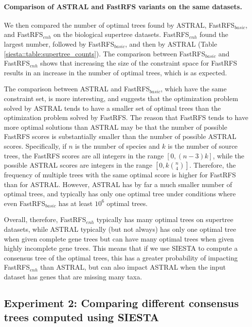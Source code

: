 \paragraph{Comparison of ASTRAL and FastRFS variants on the same datasets. }


We then compared the number of optimal trees found by  ASTRAL, FastRFS$_{basic}$, and FastRFS$_{enh}$ on the biological supertree datasets.
FastRFS$_{enh}$ found the largest number,  followed by FastRFS$_{basic}$,
and then by ASTRAL (Table \ref{siesta::table:supertree_counts}). 
The comparison between FastRFS$_{basic}$ and FastRFS$_{enh}$ shows that increasing the size of the constraint space for FastRFS results in an increase in the number of optimal trees, which is as expected. 



The comparison between ASTRAL and FastRFS$_{basic}$, which have the same constraint set, is more interesting, and suggests that the optimization problem solved by ASTRAL tends to have a smaller set of optimal trees than the optimization problem solved by FastRFS.
The reason that FastRFS tends to have more optimal solutions than ASTRAL may be that the number of possible FastRFS scores is substantially smaller than the number of possible ASTRAL scores. 
Specifically, if $n$ is the number of species and $k$ is the number of source trees, the FastRFS scores are all integers in the range $[0,(n-3)k]$, while the possible ASTRAL scores are  integers in the range $[0,k{n \choose 4}]$.
Therefore, the frequency of  multiple trees with the same optimal score is higher for FastRFS than for ASTRAL.
However, ASTRAL has by far a much smaller number of optimal trees, and typically has only one optimal tree under conditions where even FastRFS$_{basic}$ has at least $10^6$ optimal trees.


Overall, therefore, FastRFS$_{enh}$ typically has many optimal trees on supertree datasets, while ASTRAL typically (but not always) has only one  optimal tree when given complete gene trees but can have many optimal trees when given highly incomplete gene trees.
This means that if we use SIESTA  to compute a consensus tree of the optimal trees, this has a greater probability of impacting FastRFS$_{enh}$ than ASTRAL, but can also impact ASTRAL when the input dataset has genes that are missing many taxa.




\subsection{Experiment 2: Comparing different consensus trees computed using SIESTA  }

